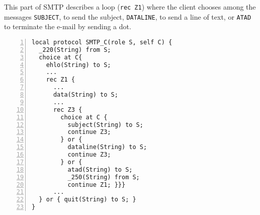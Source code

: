 This part of SMTP describes a loop (\lstinline|rec Z1|) where the client chooses
among the messages \lstinline|SUBJECT|, to send the subject,
\lstinline|DATALINE|, to send a line of text, or \lstinline|ATAD| to terminate the e-mail by sending a dot.

\begin{lstlisting}[numbers=left]
local protocol SMTP_C(role S, self C) {
  _220(String) from S;
  choice at C{
    ehlo(String) to S;
    ...
    rec Z1 {
      ...
      data(String) to S;
      ...
      rec Z3 {
        choice at C {
          subject(String) to S;
          continue Z3;
        } or {
          dataline(String) to S;
          continue Z3;
        } or {
          atad(String) to S;
          _250(String) from S;
          continue Z1; }}}
      ...
  } or { quit(String) to S; }
}
\end{lstlisting}
%
